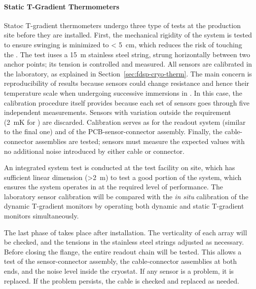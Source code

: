 \paragraph{Static T-Gradient Thermometers}
\label{sec:fdgen-slow-cryo-qc-thst}

Statoc T-gradient thermometers undergo three type of tests at the production site before they are installed. First, the mechanical rigidity of the system is tested to ensure swinging is minimized to < \SI{5}{cm}, which
reduces the risk of touching the . The test iuses a \SI{15}{m} stainless steel string, strung horizontally between two anchor points; its tension is controlled and measured. 
All sensors are calibrated in the laboratory, as explained in Section~\ref{sec:fdsp-cryo-therm}.
The main concern is reproducibility of results because sensors could change resistance and hence their temperature scale
when undergoing successive immersions in \lar. In this case, the calibration procedure itself provides  because each set of sensors goes through five independent measurements. Sensors with \rms variation outside the requirement (\SI{2}{mK} for ) are discarded.  
Calibration serves as  for the readout system (similar to the final one) and of the PCB-sensor-connector assembly. Finally, the cable-connector assemblies are tested; sensors must measure the expected values with no additional noise introduced by either cable or connector. 

An integrated system test is conducted at the \lar test facility on site, which has sufficient linear dimension (>\SI{2}{m}) to test a good portion of the system, which ensures the system
operates in \lar at the required level of performance.
The laboratory sensor calibration will be compared with the {\em in situ} calibration
of the dynamic T-gradient monitors by operating both dynamic and static T-gradient monitors simultaneously.   

The last phase of  takes place after installation. %
The verticality of each array will be checked, and the tensions in the stainless steel strings adjusted as necessary.
Before closing the flange, the entire readout chain will be tested.  
This allows a test of the sensor-connector assembly, the cable-connector assemblies at both ends, and the noise level inside the cryostat.
If any sensor is a problem, it is replaced. If the problem persists, the cable is checked and replaced as needed.

